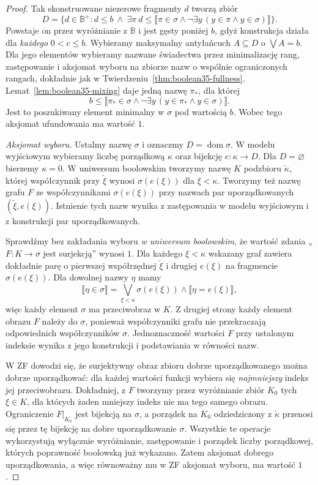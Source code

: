 \begin{proof}
Tak skonstruowane niezerowe
fragmenty $d$ tworzą zbiór
\[
 D=\{d\in\mathbb B^+:
   d\le b\ \land\
   \exists\pi\ 
      d\le\llbracket\pi\in\sigma
      \land\neg\exists y\,
        (y\in\pi\land y\in\sigma)\rrbracket\}.
\]
Powstaje on przez wyróżnianie
z $\mathbb B$ i jest gęsty poniżej
$b$, gdyż konstrukcja działa dla
\emph{każdego} $0<c\le b$.
Wybieramy maksymalny antyłańcuch
$A\subseteq D$ o $\bigvee A=b$.
Dla jego elementów wybieramy
nazwane świadectwa przez
minimalizację rang, zastępowanie
i aksjomat wyboru na zbiorze
nazw o wspólnie ograniczonych
rangach, dokładnie jak w
Twierdzeniu~\ref{thm:boolean35-fullness}.
Lemat~\ref{lem:boolean35-mixing}
daje jedną nazwę $\pi_*$,
dla której
\[
 b\le\llbracket
 \pi_*\in\sigma\land
 \neg\exists y\,
 (y\in\pi_*\land y\in\sigma)
 \rrbracket.
\]
Jest to poszukiwany element
minimalny w $\sigma$ pod
wartością $b$. Wobec tego
aksjomat ufundowania ma
wartość $1$.

\emph{Aksjomat wyboru.}
Ustalmy nazwę $\sigma$ i oznaczmy
$D=\operatorname{dom}\sigma$.
W modelu wyjściowym wybieramy
liczbę porządkową $\kappa$ oraz
bijekcję $e:\kappa\to D$.
Dla $D=\varnothing$ bierzemy
$\kappa=0$. W uniwersum boolowskim
tworzymy nazwę $K$ podzbioru
$\check\kappa$, której współczynnik
przy $\check\xi$ wynosi
$\sigma(e(\xi))$ dla $\xi<\kappa$.
Tworzymy też nazwę grafu $F$
ze współczynnikami
$\sigma(e(\xi))$ przy nazwach
par uporządkowanych
$(\check\xi,e(\xi))$.
Istnienie tych nazw wynika
z zastępowania w modelu
wyjściowym i z konstrukcji
par uporządkowanych.

Sprawdźmy bez zakładania wyboru
\emph{w uniwersum boolowskim},
że wartość zdania
„$F:K\to\sigma$ jest surjekcją”
wynosi $1$. Dla każdego
$\xi<\kappa$ wskazany graf
zawiera dokładnie parę
o pierwszej współrzędnej
$\check\xi$ i drugiej
$e(\xi)$ na fragmencie
$\sigma(e(\xi))$. Dla dowolnej
nazwy $\eta$ mamy
\[
 \llbracket\eta\in\sigma\rrbracket
 =\bigvee_{\xi<\kappa}
   \sigma(e(\xi))\wedge
   \llbracket\eta=e(\xi)\rrbracket,
\]
więc każdy element $\sigma$
ma przeciwobraz w $K$.
Z drugiej strony każdy element
obrazu $F$ należy do $\sigma$,
ponieważ współczynniki grafu
nie przekraczają odpowiednich
współczynników $\sigma$.
Jednoznaczność wartości $F$
przy ustalonym indeksie
wynika z jego konstrukcji i
podstawiania w równości nazw.

W ZF dowodzi się, że surjektywny
obraz zbioru dobrze uporządkowanego
można dobrze uporządkować:
dla każdej wartości funkcji
wybiera się \emph{najmniejszy}
indeks jej przeciwobrazu.
Dokładniej, z $F$ tworzymy
przez wyróżnianie zbiór $K_0$
tych $\xi\in K$, dla których
żaden mniejszy indeks nie ma
tego samego obrazu. Ograniczenie
$F|_{K_0}$ jest bijekcją na
$\sigma$, a porządek na $K_0$
odziedziczony z $\check\kappa$
przenosi się przez tę bijekcję
na dobre uporządkowanie $\sigma$.
Wszystkie te operacje wykorzystują
wyłącznie wyróżnianie, zastępowanie
i porządek liczby porządkowej,
których poprawność boolowską
już wykazano. Zatem aksjomat
dobrego uporządkowania, a więc
równoważny mu w ZF aksjomat
wyboru, ma wartość $1$.


\end{proof}
